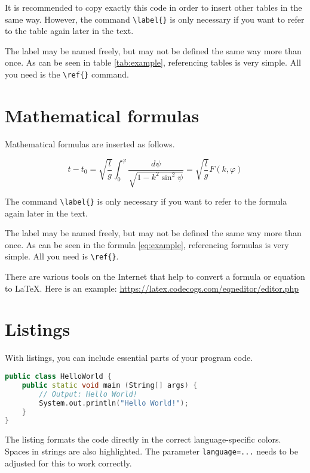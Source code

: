 It is recommended to copy exactly this code in order to insert other tables in the same way. However, the command \texttt{\textbackslash{}label\{\}} is only necessary if you want to refer to the table again later in the text.

The label may be named freely, but may not be defined the same way more than once. As can be seen in table \ref{tab:example}, referencing tables is very simple. All you need is the \texttt{\textbackslash{}ref\{\}} command.


\section{Mathematical formulas}
Mathematical formulas are inserted as follows.

\begin{equation}
t-t_{0}=\sqrt{\frac{l}{g}}\int_{0}^{\varphi}{\frac{d\psi}{\sqrt{1-k^{2}\sin^{2} {\psi}}}} = \sqrt{\frac{l}{g}} F(k,\varphi)
\label{eq:example}
\end{equation}

The command \texttt{\textbackslash{}label\{\}} is only necessary if you want to refer to the formula again later in the text.

The label may be named freely, but may not be defined the same way more than once. As can be seen in the formula \ref{eq:example}, referencing formulas is very simple. All you need is \texttt{\textbackslash{}ref\{\}}.

There are various tools on the Internet that help to convert a formula or equation to LaTeX. Here is an example: \href{https://latex.codecogs.com/eqneditor/editor.php}{https://latex.codecogs.com/eqneditor/editor.php}


\section{Listings}
With listings, you can include essential parts of your program code.

\begin{lstlisting}[caption=My listing example, label=lst:example, language=C++]
public class HelloWorld {
	public static void main (String[] args) {
		// Output: Hello World!
		System.out.println("Hello World!");
	}
}
\end{lstlisting}

The listing formats the code directly in the correct language-specific colors. Spaces in strings are also highlighted. The parameter \texttt{language=...} needs to be adjusted for this to work correctly.


